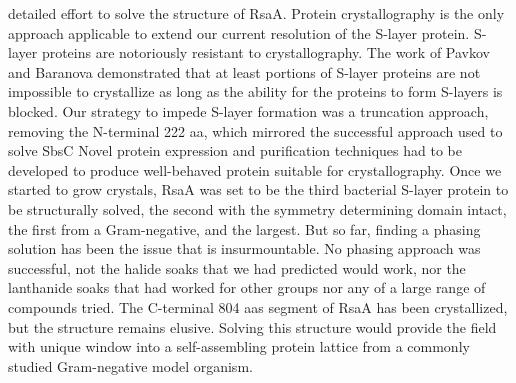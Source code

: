  detailed effort to solve the structure of RsaA. Protein crystallography is the only approach applicable to extend our current resolution of the \caulobacter{} \ac{S-layer} protein. \Ac{S-layer} proteins are notoriously resistant to crystallography. The work of Pavkov \etal{} and Baranova \etal{} demonstrated that at least portions of \ac{S-layer} proteins are not impossible to crystallize as long as the ability for the proteins to form \acp{S-layer} is blocked. Our strategy to impede \ac{S-layer} formation was a truncation approach, removing the N-terminal 222 \ac{aa}, which mirrored the successful approach used to solve SbsC Novel protein expression and purification techniques had to be developed to produce well-behaved protein suitable for crystallography. Once we started to grow crystals, RsaA was set to be the third bacterial \ac{S-layer} protein to be structurally solved, the second with the symmetry determining domain intact, the first from a Gram-negative, and the largest. But so far, finding a phasing solution has been the issue that is insurmountable. No phasing approach was successful, not the halide soaks that we had predicted would work, nor the lanthanide soaks that had worked for other groups nor any of a large range of  compounds tried. The C-terminal 804 \acp{aa} segment of RsaA has been crystallized, but the structure remains elusive. Solving this structure would provide the field with unique window into a self-assembling protein lattice from a commonly studied Gram-negative model organism. 

